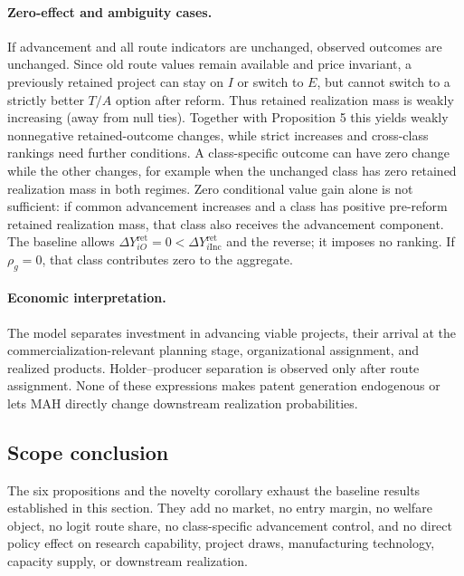 \paragraph{Zero-effect and ambiguity cases.}
If advancement and all route indicators are unchanged, observed outcomes are
unchanged. Since old route values remain available and price invariant, a
previously retained project can stay on \(I\) or switch to \(E\), but cannot
switch to a strictly better \(T/A\) option after reform. Thus retained
realization mass is weakly increasing (away from null ties). Together with
Proposition 5 this yields weakly nonnegative retained-outcome changes, while
strict increases and cross-class rankings need further conditions. A class-specific outcome can have zero change while the other
changes, for example when the unchanged class has zero retained realization
mass in both regimes. Zero conditional value gain alone is not sufficient:
if common advancement increases and a class has positive pre-reform retained
realization mass, that class also receives the advancement component. The
baseline allows
\(\Delta Y_{iO}^{\mathrm{ret}}=0<
\Delta Y_{i\mathrm{Inc}}^{\mathrm{ret}}\) and the reverse; it imposes no
ranking. If \(\rho_g=0\), that class contributes zero to the aggregate.

\paragraph{Economic interpretation.}
The model separates investment in advancing viable projects, their arrival at
the commercialization-relevant planning stage, organizational assignment, and
realized products. Holder--producer separation is observed only after route
assignment. None of these expressions makes patent generation endogenous or
lets MAH directly change downstream realization probabilities.

\subsection{Scope conclusion}
\label{subsec:p08-scope}

The six propositions and the novelty corollary exhaust the baseline results
established in this section. They add no market, no entry margin, no welfare object, no
logit route share, no class-specific advancement control, and no direct policy
effect on research capability, project draws, manufacturing technology,
capacity supply, or downstream realization.
